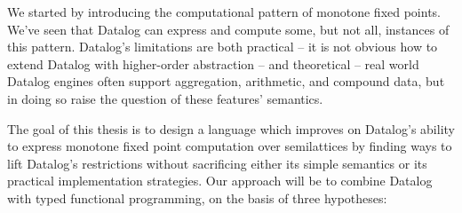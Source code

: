 We started by introducing the computational pattern of monotone fixed points.
We've seen that Datalog can express and compute some, but not all, instances of
this pattern. Datalog's limitations are both practical -- it is not obvious how
to extend Datalog with higher-order abstraction -- and theoretical -- real world
Datalog engines often support aggregation, arithmetic, and compound data, but in
doing so raise the question of these features' semantics.


 \label{goal-of-thesis}

The goal of this thesis is to design a language which improves on Datalog's
ability to express monotone fixed point computation over semilattices by finding
ways to lift Datalog's restrictions without sacrificing either its simple
semantics or its practical implementation strategies.
%
Our approach will be to combine Datalog with typed functional programming, on the basis of three hypotheses:

